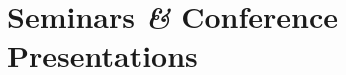 \documentclass[a4paper,10pt]{article}
\renewenvironment{itemize}{
  \begin{list}{}
    { \setlength{\itemsep}{5pt}
      \setlength{\parsep}{0pt}
      \setlength{\topsep}{0pt}
      \setlength{\leftmargin}{0em} } }{
  \end{list}}
\begin{document}


\section*{Seminars \textit{\&} Conference Presentations}

\end{document}
